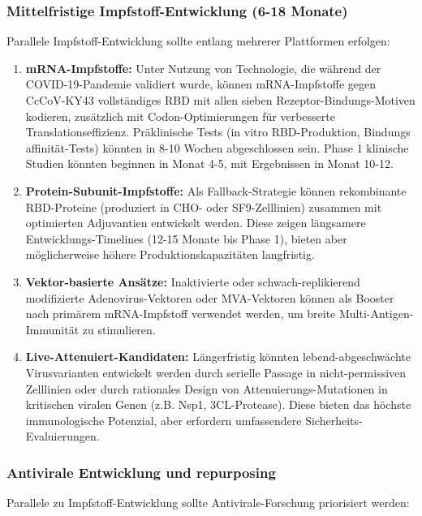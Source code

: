 ﻿\documentclass[11pt,a4paper]{article}
\theoremstyle{definition}
\begin{document}
\subsubsection{Mittelfristige Impfstoff-Entwicklung (6-18 Monate)}

Parallele Impfstoff-Entwicklung sollte entlang mehrerer Plattformen erfolgen:

\begin{enumerate}
\item \textbf{mRNA-Impfstoffe:} Unter Nutzung von Technologie, die während der COVID-19-Pandemie validiert wurde, können mRNA-Impfstoffe gegen CcCoV-KY43 vollständiges RBD mit allen sieben Rezeptor-Bindungs-Motiven kodieren, zusätzlich mit Codon-Optimierungen für verbesserte Translationseffizienz. Präklinische Tests (in vitro RBD-Produktion, Bindungs ­affinität-Tests) könnten in 8-10 Wochen abgeschlossen sein. Phase 1 klinische Studien könnten beginnen in Monat 4-5, mit Ergebnissen in Monat 10-12.

\item \textbf{Protein-Subunit-Impfstoffe:} Als Fallback-Strategie können rekombinante RBD-Proteine (produziert in CHO- oder SF9-Zelllinien) zusammen mit optimierten Adjuvantien entwickelt werden. Diese zeigen längsamere Entwicklungs-Timelines (12-15 Monate bis Phase 1), bieten aber möglicherweise höhere Produktionskapazitäten langfristig.

\item \textbf{Vektor-basierte Ansätze:} Inaktivierte oder schwach-replikierend modifizierte Adenovirus-Vektoren oder MVA-Vektoren können als Booster nach primärem mRNA-Impfstoff verwendet werden, um breite Multi-Antigen-Immunität zu stimulieren.

\item \textbf{Live-Attenuiert-Kandidaten:} Längerfristig könnten lebend-abgeschwächte Virusvarianten entwickelt werden durch serielle Passage in nicht-permissiven Zelllinien oder durch rationales Design von Attenuierungs-Mutationen in kritischen viralen Genen (z.B. Nsp1, 3CL-Protease). Diese bieten das höchste immunologische Potenzial, aber erfordern umfassendere Sicherheits-Evaluierungen.
\end{enumerate}

\subsubsection{Antivirale Entwicklung und repurposing}

Parallele zu Impfstoff-Entwicklung sollte Antivirale-Forschung priorisiert werden:
\end{document}
